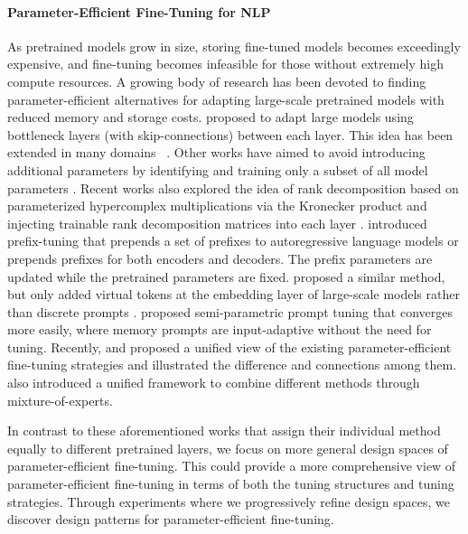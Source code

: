 \paragraph{Parameter-Efficient Fine-Tuning for NLP} As pretrained models grow in size, storing fine-tuned models becomes exceedingly expensive, and fine-tuning becomes infeasible for those without extremely high compute resources. A growing body of research has been devoted to finding parameter-efficient alternatives for adapting large-scale pretrained models with reduced memory and storage costs. \citet{houlsby2019parameter} proposed to adapt large models using bottleneck layers (with skip-connections) between each layer. This idea has been extended in many domains ~\citep{stickland2019bert,pfeiffer2020adapterfusion,rebuffi2017learning,lin2020exploring}. Other works have aimed to avoid introducing additional parameters by identifying and training only a subset of all model parameters \citep{zhao2020masking,guo2020parameter,mallya2018piggyback,radiya2020fine, FISHmask, https://doi.org/10.48550/arxiv.2106.10199}. Recent works also explored the idea of rank decomposition based on parameterized hypercomplex multiplications via the Kronecker product \citep{zhang2021beyond} and injecting trainable rank decomposition matrices into each layer \citep{https://doi.org/10.48550/arxiv.2106.09685,karimi2021compacter}. \citet{li2021Prefixtuning} introduced prefix-tuning that prepends a set of prefixes to autoregressive language models or prepends prefixes for both encoders and decoders. The prefix parameters are updated while the pretrained parameters are fixed.  \citet{lester2021power} proposed a similar method, but only added virtual tokens at the embedding layer of large-scale models rather than discrete prompts \citep{https://doi.org/10.48550/arxiv.2205.12548,https://doi.org/10.48550/arxiv.2208.03229}. 
\citet{bari2022spt} proposed semi-parametric prompt tuning that converges more easily, where memory prompts are input-adaptive without the need for tuning. Recently, \citet{https://doi.org/10.48550/arxiv.2110.04366} and \citet{https://doi.org/10.48550/arxiv.2203.06904} proposed a unified view of the existing parameter-efficient fine-tuning strategies and illustrated the difference and connections among them. \citet{mao-etal-2022-unipelt} also introduced a unified framework to combine different methods through mixture-of-experts.

In contrast to these aforementioned works that assign their individual method equally to different pretrained layers, we focus on more general design spaces of parameter-efficient fine-tuning. This could provide a more comprehensive view of parameter-efficient fine-tuning in terms of both the tuning structures and tuning strategies. Through experiments where we progressively refine design spaces, we discover design patterns for parameter-efficient fine-tuning.

